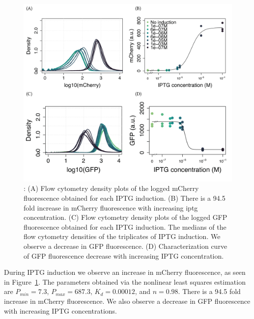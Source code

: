 


\begin{figure}[tb]
	\begin{center}
\includegraphics[width=\textwidth]{../../chapters/chapterABCFlow/images/pKDL071_concentrations_model_fit-01.png}
\caption[Characterisation of pKDL071 after \acrshort{iptg} induction]{\label{fig:switch_concentrations_model}:  (A) Flow cytometry density plots of the logged mCherry fluorescence obtained for each IPTG induction. (B) There is a 94.5 fold increase in mCherry fluorescence with increasing \acrshort{iptg} concentration. (C) Flow cytometry density plots of the logged GFP fluorescence obtained for each IPTG induction. The medians of the flow cytometry densities of the triplicates of IPTG induction. We observe a decrease in GFP fluorescence. (D) Characterization curve of GFP fluorescence decrease with increasing IPTG concentration.}
\end{center}
\end{figure}


During IPTG induction we observe an increase in mCherry fluorescence, as seen in Figure~\ref{fig:switch_concentrations_model}. The parameters obtained via the nonlinear least squares estimation are $P_{min} = 7.3$, $P_{max}=687.3$, $K_d=0.00012$, and $n=0.98$. There is a 94.5 fold increase in mCherry fluorescence.  We also observe a decrease in GFP fluorescence with increasing IPTG concentrations. 

